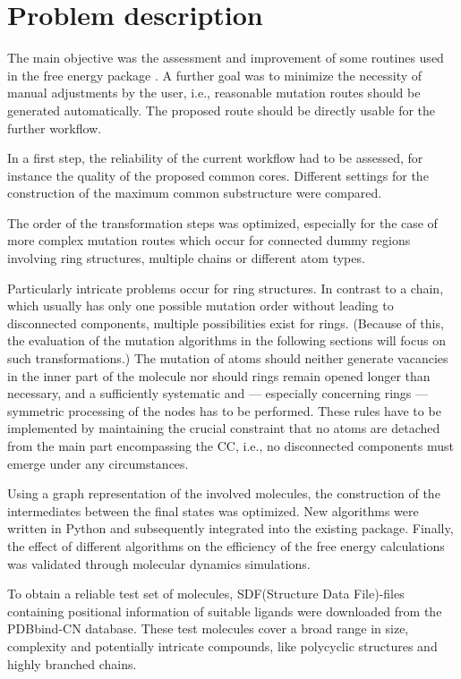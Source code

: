 \chapter{Problem description }

The main objective was the assessment and improvement of some routines
used in the free energy package {\trafo}. A further goal was to
minimize the necessity of manual adjustments by the user, i.e.,
reasonable mutation routes should be generated automatically. The
proposed route should be directly usable for the further {\trafo}
workflow.

In a first step, the reliability of the current {\trafo} workflow
had to be assessed, for instance the quality of the proposed common
cores. Different settings for the construction of the maximum common
substructure were compared. 

The order of the transformation steps was optimized, especially
for the case of more complex mutation routes which occur for connected
dummy regions involving ring structures, multiple chains or different
atom types. 

Particularly intricate problems occur for ring structures. In contrast to a chain, which usually has only one possible mutation order without leading to disconnected components, multiple possibilities  exist for rings. (Because of this, the evaluation of the mutation algorithms in the following sections will focus on such transformations.) The mutation of atoms should neither generate vacancies in the inner part of the
molecule nor should rings remain opened longer than necessary, and
a sufficiently systematic and --- especially concerning rings --- symmetric
processing of the nodes has to be performed. These rules have to be
implemented by maintaining the crucial constraint that no atoms are
detached from the main part encompassing the CC, i.e., no
disconnected components must emerge under any circumstances.

Using a graph representation of the involved molecules, the construction
of the intermediates between the final states was optimized.
New algorithms were written in Python and subsequently integrated
into the existing {\trafo} package. Finally, the effect of different
algorithms on the efficiency of the free energy calculations was validated through molecular dynamics simulations. 

To obtain a reliable test set of molecules, SDF(Structure Data File)-files containing positional information of suitable ligands were downloaded from the PDBbind-CN \cite{Wang.2004} database. These test molecules cover a
broad range in size, complexity and potentially intricate compounds,
like polycyclic structures and highly branched chains.

